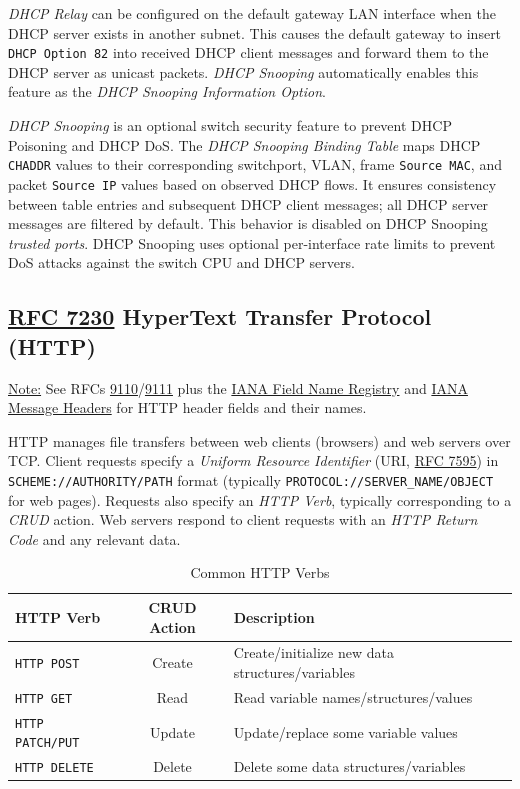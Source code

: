 \documentclass[12pt]{article}
\newif\ifcolor											%
\newcommand{\note}[1]{\ifcolor \colorbox{#1}{Note:}\else \underline{Note:}\fi}
\newcommand{\rfc}[1]{\href{https://datatracker.ietf.org/doc/html/rfc#1}{#1}}
\newcommand{\RFC}[1]{\href{https://datatracker.ietf.org/doc/html/rfc#1}{RFC #1}}
\begin{document}
	\textit{DHCP Relay} can be configured on the default gateway LAN interface when the DHCP server exists in another subnet. This causes the default gateway to insert \texttt{DHCP Option 82} into received DHCP client messages and forward them to the DHCP server as unicast packets. \textit{DHCP Snooping} automatically enables this feature as the \textit{DHCP Snooping Information Option}.

	\textit{DHCP Snooping} is an optional switch security feature to prevent DHCP Poisoning and DHCP DoS. The \textit{DHCP Snooping Binding Table} maps DHCP \texttt{CHADDR} values to their corresponding switchport, VLAN, frame \texttt{Source MAC}, and packet \texttt{Source IP} values based on observed DHCP flows. It ensures consistency between table entries and subsequent DHCP client messages; all DHCP server messages are filtered by default. This behavior is disabled on DHCP Snooping \textit{trusted ports}. DHCP Snooping uses optional per-interface rate limits to prevent DoS attacks against the switch CPU and DHCP servers.


	\subsection[RFC 7230 HTTP]{\RFC{7230} HyperText Transfer Protocol (HTTP) \label{subsec:HTTP}}
	\note{Goldenrod} See RFCs \rfc{9110}/\rfc{9111} plus the \href{https://www.iana.org/assignments/http-fields/http-fields.xhtml#field-names}{IANA Field Name Registry} and \href{https://www.iana.org/assignments/message-headers/message-headers.xml#perm-headers}{IANA Message Headers} for HTTP header fields and their names.

	HTTP manages file transfers between web clients (browsers) and web servers over TCP. Client requests specify a \textit{Uniform Resource Identifier} (URI, \RFC{7595}) in \texttt{SCHEME://AUTHORITY/PATH} format (typically \texttt{PROTOCOL://SERVER\_NAME/OBJECT} for web pages). Requests also specify an \textit{HTTP Verb}, typically corresponding to a \textit{CRUD} action. Web servers respond to client requests with an \textit{HTTP Return Code} and any relevant data.

	\begin{table}[H]
	\centering
	\caption{Common HTTP Verbs \label{tab:HTTP VERBS}}
	\begin{tabular}{@{} l c l @{}}\hline
	\textbf{HTTP Verb}		& \textbf{CRUD Action}	& \textbf{Description}\\\hline
	\texttt{HTTP POST}		& Create			& Create/initialize new data structures/variables\\
	\texttt{HTTP GET}			& Read			& Read variable names/structures/values\\
	\texttt{HTTP PATCH/PUT}	& Update			& Update/replace some variable values\\
	\texttt{HTTP DELETE}		& Delete			& Delete some data structures/variables\\\hline
	\end{tabular}\end{table}
\end{document}
